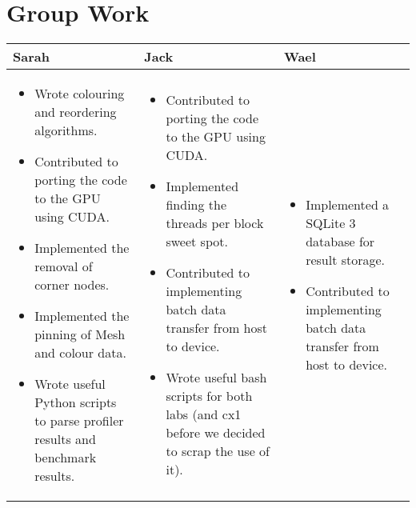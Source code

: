 \section{Group Work}
\begin{tabular}{|p{5.5cm}| p{5.5cm} | p{5.5cm} |}
  \hline
  Sarah & Jack & Wael\\
  \hline
  \hline
  \begin{itemize}
    \item Wrote colouring and reordering algorithms.
    \item Contributed to porting the code to the GPU using CUDA.
    \item Implemented the removal of corner nodes.
    \item Implemented the pinning of Mesh and colour data.
    \item Wrote useful Python scripts to parse profiler results and benchmark results.
  \end{itemize} &

  \begin{itemize}
    \item Contributed to porting the code to the GPU using CUDA.
    \item Implemented finding the threads per block sweet spot.
    \item Contributed to implementing batch data transfer from host to device.
    \item Wrote useful bash scripts for both labs (and cx1 before we decided to scrap the use of it).
  \end{itemize} &

  \begin{itemize}
    \item Implemented a SQLite 3 database for result storage.
    \item Contributed to implementing batch data transfer from host to device.
  \end{itemize} \\
  \hline
\end{tabular}
